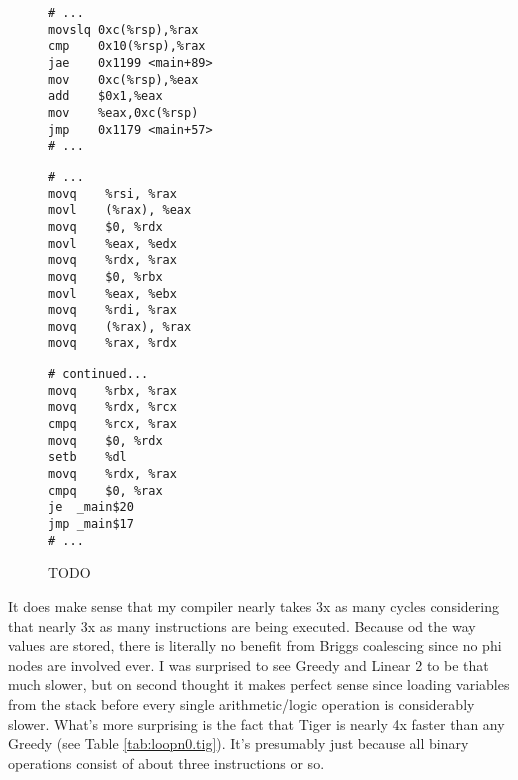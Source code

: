 \documentclass{article}
\begin{document}
\begin{figure}[H]
     \centering
     \begin{minipage}[b]{0.32\textwidth}
\begin{verbatim}
# ...
movslq 0xc(%rsp),%rax
cmp    0x10(%rsp),%rax
jae    0x1199 <main+89>
mov    0xc(%rsp),%eax
add    $0x1,%eax
mov    %eax,0xc(%rsp)
jmp    0x1179 <main+57>
# ...
     \end{verbatim}
     \caption{TODO}\label{fig:clang-loop}
   \end{minipage}
   \begin{minipage}[b]{0.65\textwidth}
   \begin{minipage}[b]{0.50\textwidth}
  \begin{verbatim}
# ...
movq	%rsi, %rax
movl	(%rax), %eax
movq	$0, %rdx
movl	%eax, %edx
movq	%rdx, %rax
movq	$0, %rbx
movl	%eax, %ebx
movq	%rdi, %rax
movq	(%rax), %rax
movq	%rax, %rdx
     \end{verbatim}
   \end{minipage}
   \begin{minipage}[b]{0.50\textwidth}
  \begin{verbatim}
# continued...
movq	%rbx, %rax
movq	%rdx, %rcx
cmpq	%rcx, %rax
movq	$0, %rdx
setb	%dl
movq	%rdx, %rax
cmpq	$0, %rax
je	_main$20
jmp	_main$17
# ...
     \end{verbatim}
   \end{minipage}
     \caption{TODO}\label{fig:my-loop0}
   \end{minipage}
\end{figure}
\noindent It does make sense that my compiler nearly takes 3x as many cycles considering that nearly 3x as many instructions are being executed.   Because od the way values are stored, there is literally no benefit from Briggs coalescing since no phi nodes are involved ever.
I was surprised to see Greedy and Linear 2 to be that much slower, but on second thought it makes perfect sense since loading variables from the stack before every single arithmetic/logic operation is considerably slower. What's more surprising is the fact that Tiger is nearly 4x faster than any Greedy (see Table \ref{tab:loopn0.tig}).
It's presumably just because all binary operations consist of  about three instructions or so.
\end{document}
